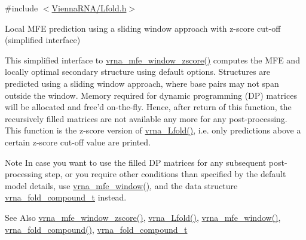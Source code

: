 {\ttfamily \#include $<$\hyperlink{Lfold_8h}{Vienna\-R\-N\-A/\-Lfold.\-h}$>$}



Local M\-F\-E prediction using a sliding window approach with z-\/score cut-\/off (simplified interface) 

This simplified interface to \hyperlink{group__local__mfe__fold_gaa4f67ae94efd08d800c17f9b53423fd6}{vrna\-\_\-mfe\-\_\-window\-\_\-zscore()} computes the M\-F\-E and locally optimal secondary structure using default options. Structures are predicted using a sliding window approach, where base pairs may not span outside the window. Memory required for dynamic programming (D\-P) matrices will be allocated and free'd on-\/the-\/fly. Hence, after return of this function, the recursively filled matrices are not available any more for any post-\/processing. This function is the z-\/score version of \hyperlink{group__local__mfe__fold_ga4918cce52bf69c1913cda503b2ac75d8}{vrna\-\_\-\-Lfold()}, i.\-e. only predictions above a certain z-\/score cut-\/off value are printed.

\begin{DoxyNote}{Note}
In case you want to use the filled D\-P matrices for any subsequent post-\/processing step, or you require other conditions than specified by the default model details, use \hyperlink{group__local__mfe__fold_ga689df235a1915a1ad56e377383c044ce}{vrna\-\_\-mfe\-\_\-window()}, and the data structure \hyperlink{group__fold__compound_ga1b0cef17fd40466cef5968eaeeff6166}{vrna\-\_\-fold\-\_\-compound\-\_\-t} instead.
\end{DoxyNote}
\begin{DoxySeeAlso}{See Also}
\hyperlink{group__local__mfe__fold_gaa4f67ae94efd08d800c17f9b53423fd6}{vrna\-\_\-mfe\-\_\-window\-\_\-zscore()}, \hyperlink{group__local__mfe__fold_ga4918cce52bf69c1913cda503b2ac75d8}{vrna\-\_\-\-Lfold()}, \hyperlink{group__local__mfe__fold_ga689df235a1915a1ad56e377383c044ce}{vrna\-\_\-mfe\-\_\-window()}, \hyperlink{group__fold__compound_ga6601d994ba32b11511b36f68b08403be}{vrna\-\_\-fold\-\_\-compound()}, \hyperlink{group__fold__compound_ga1b0cef17fd40466cef5968eaeeff6166}{vrna\-\_\-fold\-\_\-compound\-\_\-t}
\end{DoxySeeAlso}

